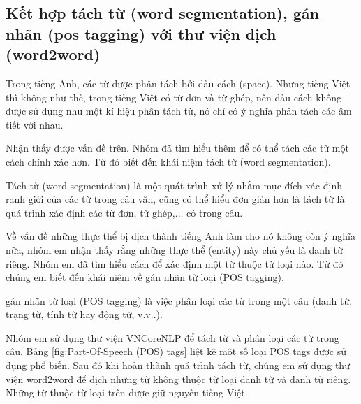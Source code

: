 \subsection{Kết hợp tách từ (word segmentation), gán nhãn (pos tagging) với thư viện dịch (word2word)}

Trong tiếng Anh, các từ được phân tách bởi dấu cách (space). Nhưng tiếng Việt thì không như thế, trong tiếng Việt có từ đơn và từ ghép, nên dấu cách không được sử dụng như một kí hiệu phân tách từ, nó chỉ có ý nghĩa phân tách các âm tiết với nhau. 

Nhận thấy được vấn đề trên. Nhóm đã tìm hiểu thêm để có thể tách các từ một cách chính xác hơn. Từ đó biết đến khái niệm tách từ (word segmentation). 

Tách từ (word segmentation) là một quát trình xử lý nhằm mục đích xác định ranh giới của các từ trong câu văn, cũng có thể hiểu đơn giản hơn là tách từ là quá trình xác định các từ đơn, từ ghép,... có trong câu.

Về vấn đề những thực thể bị dịch thành tiếng Anh làm cho nó không còn ý nghĩa nữa, nhóm em nhận thấy rằng những thực thể (entity) này chủ yếu là danh từ riêng. Nhóm em đã tìm hiểu  cách để xác định một từ thuộc từ loại nào. Từ đó chúng em biết đến khái niệm về gán nhãn từ loại (POS tagging).

gán nhãn từ loại (POS tagging) là việc phân loại các từ trong một câu (danh từ, trạng từ, tính từ hay động từ, v.v..).

Nhóm em sử dụng thư viện VNCoreNLP để tách từ và phân loại các từ trong câu. Bảng \ref{fig:Part-Of-Speech (POS) tags} liệt kê một số loại POS tags được sử dụng phổ biến. Sau đó khi hoàn thành quá trình tách từ, chúng em sử dụng thư viện word2word để dịch những từ không thuộc từ loại danh từ và danh từ riêng. Những từ thuộc từ loại trên được giữ nguyên tiếng Việt.


